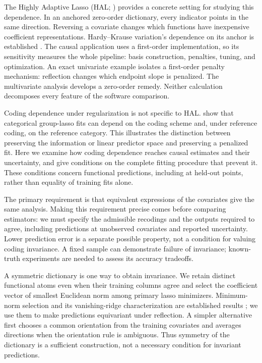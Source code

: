 \documentclass[11pt]{article}
\theoremstyle{definition}
\theoremstyle{remark}
\begin{document}
The Highly Adaptive Lasso (HAL; \citealp{benkeser2016,vanderlaan2017})
provides a concrete setting for studying this dependence. In an anchored
zero-order dictionary, every indicator points in the same direction.
Reversing a covariate changes which functions have inexpensive coefficient
representations. Hardy--Krause variation's dependence on its anchor is
established \citep{aistleitner2015,aistleitner2017}. The causal application
uses a first-order implementation, so its sensitivity measures the whole
pipeline: basis construction, penalties, tuning, and optimization. An exact
univariate example isolates a first-order penalty mechanism: reflection
changes which endpoint slope is penalized. The multivariate analysis develops
a zero-order remedy. Neither calculation decomposes every feature of the
software comparison.

Coding dependence under regularization is not specific to HAL.
\citet{detmer2020} show that categorical group-lasso fits can depend on
the coding scheme and, under reference coding, on the reference category.
This illustrates the distinction between preserving the information or
linear predictor space and preserving a penalized fit. Here we examine
how coding dependence reaches causal estimates and their uncertainty,
and give conditions on the complete fitting procedure that prevent it.
These conditions concern functional predictions, including at held-out
points, rather than equality of training fits alone.

The primary requirement is that equivalent expressions of the covariates
give the same analysis. Making this requirement precise comes before
comparing estimators: we must specify the admissible recodings and the
outputs required to agree, including predictions at unobserved covariates
and reported uncertainty. Lower prediction error is a separate possible
property, not a condition for valuing coding invariance. A fixed sample can
demonstrate failure of invariance; known-truth experiments are needed to
assess its accuracy tradeoffs.

A symmetric dictionary is one way to obtain invariance. We retain distinct
functional atoms even when their training columns agree and select the
coefficient vector of smallest Euclidean norm among primary lasso minimizers.
Minimum-norm selection and its vanishing-ridge characterization are
established results \citep[Lemmas 9--10]{tibshirani2013}; we use them to make
predictions equivariant under reflection. A simpler alternative first chooses
a common orientation from the training covariates and averages directions
when the orientation rule is ambiguous. Thus symmetry of the dictionary is
a sufficient construction, not a necessary condition for invariant predictions.
\end{document}
